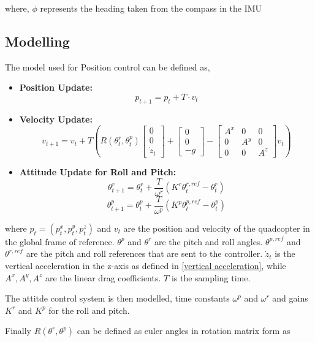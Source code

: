 \documentclass{report}
\begin{document}
where, \(\phi\) represents the heading taken from the compass in the IMU

\subsection{Modelling}
The model used for Position control can be defined as,
\begin{itemize}
  \item \textbf{Position Update:}
  \[
  p_{t+1} = p_t + T \cdot v_t
  \]
  
  \item \textbf{Velocity Update:}
  \[
  v_{t+1} = v_t + T \left( R(\theta^r_t, \theta^p_t) \begin{bmatrix}0 \\ 0 \\ \dot{z}_t\end{bmatrix} + \begin{bmatrix}0 \\ 0 \\ -g\end{bmatrix} - \begin{bmatrix}A^x & 0 & 0 \\ 0 & A^y & 0 \\ 0 & 0 & A^z\end{bmatrix} v_t \right)
  \]
  
  \item \textbf{Attitude Update for Roll and Pitch:}
  \[
  \theta^r_{t+1} = \theta^r_t + \frac{T}{\omega^r}(K^r\theta^{r,ref}_t - \theta^r_t)
  \]
  \[
  \theta^p_{t+1} = \theta^p_t + \frac{T}{\omega^p}(K^p\theta^{p,ref}_t - \theta^p_t)
  \]
  \end{itemize}
  

where \(p_t = (p^x_t, p^y_t, p^z_t)\) and \(v_t\) are the position and velocity of the quadcopter in the global frame of reference. \(\theta^p\) and \(\theta^r\) are the pitch and roll angles. \(\theta^{p,ref}\) and \(\theta^{r,ref}\) are the pitch and roll references that are sent to the controller. \(\dot{z}_t\) is the vertical acceleration in the z-axis as defined in \ref{vertical acceleration}, while \(A^x, A^y, A^z\) are the linear drag coefficients. \(T\) is the sampling time.

The attitde control system is then modelled, time constants \(\omega^p\) and \(\omega^r\) and gains \(K^r\) and \(K^p\)
for the roll and pitch. 

Finally \(R(\theta^r, \theta^p)\) can be defined as euler angles in rotation matrix form as
\end{document}
